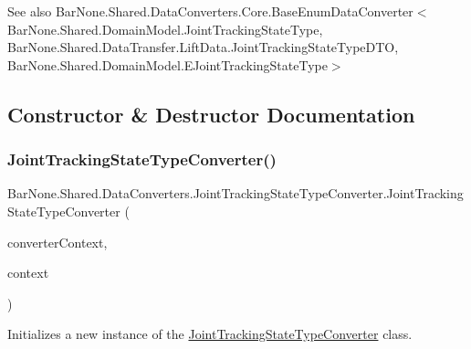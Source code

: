 \begin{DoxySeeAlso}{See also}
Bar\+None.\+Shared.\+Data\+Converters.\+Core.\+Base\+Enum\+Data\+Converter$<$\+Bar\+None.\+Shared.\+Domain\+Model.\+Joint\+Tracking\+State\+Type, Bar\+None.\+Shared.\+Data\+Transfer.\+Lift\+Data.\+Joint\+Tracking\+State\+Type\+D\+T\+O, Bar\+None.\+Shared.\+Domain\+Model.\+E\+Joint\+Tracking\+State\+Type$>$


\end{DoxySeeAlso}


\subsection{Constructor \& Destructor Documentation}
\mbox{\label{class_bar_none_1_1_shared_1_1_data_converters_1_1_joint_tracking_state_type_converter_a23d38da410982f6220a1a6e62257bb97}} 
\subsubsection{\texorpdfstring{Joint\+Tracking\+State\+Type\+Converter()}{JointTrackingStateTypeConverter()}}
{\footnotesize\ttfamily Bar\+None.\+Shared.\+Data\+Converters.\+Joint\+Tracking\+State\+Type\+Converter.\+Joint\+Tracking\+State\+Type\+Converter (\begin{DoxyParamCaption}\item[{\mbox{\hyperlink{class_bar_none_1_1_shared_1_1_data_converters_1_1_converters}{Converters}}}]{converter\+Context,  }\item[{\mbox{\hyperlink{interface_bar_none_1_1_shared_1_1_core_1_1_i_domain_context}{I\+Domain\+Context}}}]{context }\end{DoxyParamCaption})}



Initializes a new instance of the \mbox{\hyperlink{class_bar_none_1_1_shared_1_1_data_converters_1_1_joint_tracking_state_type_converter}{Joint\+Tracking\+State\+Type\+Converter}} class. 


